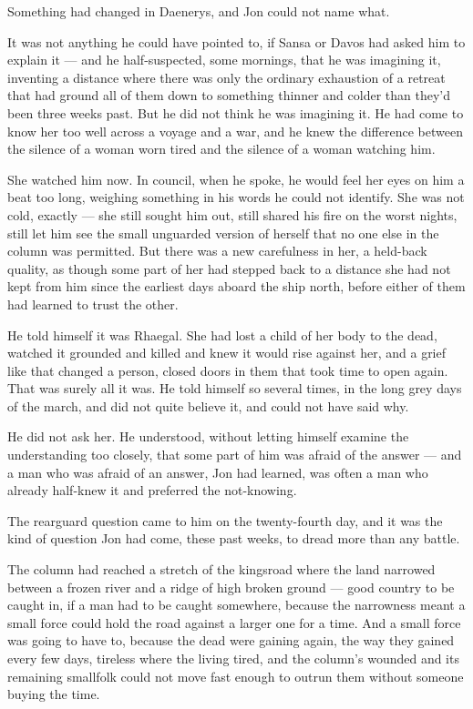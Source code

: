 Something had changed in Daenerys, and Jon could not name what.

It was not anything he could have pointed to, if Sansa or Davos had asked him to explain it — and he half-suspected, some mornings, that he was imagining it, inventing a distance where there was only the ordinary exhaustion of a retreat that had ground all of them down to something thinner and colder than they’d been three weeks past. But he did not think he was imagining it. He had come to know her too well across a voyage and a war, and he knew the difference between the silence of a woman worn tired and the silence of a woman watching him.

She watched him now. In council, when he spoke, he would feel her eyes on him a beat too long, weighing something in his words he could not identify. She was not cold, exactly — she still sought him out, still shared his fire on the worst nights, still let him see the small unguarded version of herself that no one else in the column was permitted. But there was a new carefulness in her, a held-back quality, as though some part of her had stepped back to a distance she had not kept from him since the earliest days aboard the ship north, before either of them had learned to trust the other.

He told himself it was Rhaegal. She had lost a child of her body to the dead, watched it grounded and killed and knew it would rise against her, and a grief like that changed a person, closed doors in them that took time to open again. That was surely all it was. He told himself so several times, in the long grey days of the march, and did not quite believe it, and could not have said why.

He did not ask her. He understood, without letting himself examine the understanding too closely, that some part of him was afraid of the answer — and a man who was afraid of an answer, Jon had learned, was often a man who already half-knew it and preferred the not-knowing.

\sceneBreak

The rearguard question came to him on the twenty-fourth day, and it was the kind of question Jon had come, these past weeks, to dread more than any battle.

The column had reached a stretch of the kingsroad where the land narrowed between a frozen river and a ridge of high broken ground — good country to be caught in, if a man had to be caught somewhere, because the narrowness meant a small force could hold the road against a larger one for a time. And a small force was going to have to, because the dead were gaining again, the way they gained every few days, tireless where the living tired, and the column’s wounded and its remaining smallfolk could not move fast enough to outrun them without someone buying the time.

